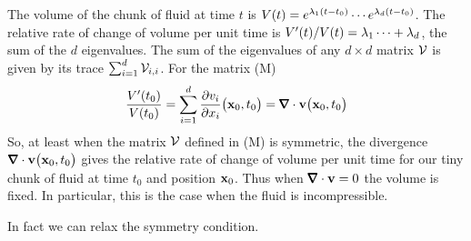 \begin{eg}
The volume of the chunk of fluid at time $t$ is 
$V(t)=e^{\lambda_1 (t-t_0)}\cdots e^{\lambda_d (t-t_0)}$. The relative rate of change
of volume per unit time is $V'(t)/V(t)=\lambda_1\cdots+\lambda_d$, the sum of the
$d$ eigenvalues.  The sum of the eigenvalues of any $d\times d$ matrix $\mathcal{V}$ 
is given by its trace $\sum_{i=1}^d \mathcal{V}_{i,i}$. For the matrix (M)
\begin{equation*}
\frac{V'(t_0)}{V(t_0)}
=\sum_{i=1}^d \frac{\partial v_i}{\partial x_i}\big(\vx_0,t_0\big)
=\vnabla\cdot\vv\big(\vx_0,t_0\big)
\end{equation*}
So, at least when the matrix $\mathcal{V}$ defined in (M) is symmetric, the 
divergence $\vnabla\cdot\vv\big(\vx_0,t_0\big)$ gives the relative 
rate of change of volume per unit time for our tiny chunk of fluid at 
time $t_0$ and position $\mathbf{x}_0$. Thus when $\vnabla\cdot\vv=0$ the volume is
fixed. In particular, this is the case when the fluid is incompressible. 
\end{eg}
In fact we can relax the symmetry condition.
